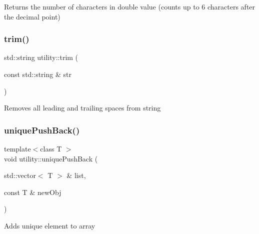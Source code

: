 Returns the number of characters in double value (counts up to 6 characters after the decimal point) \mbox{\label{namespaceutility_a4b1e0a26a1bf269307ee7e7aade748d7}} 
\subsubsection{\texorpdfstring{trim()}{trim()}}
{\footnotesize\ttfamily std\+::string utility\+::trim (\begin{DoxyParamCaption}\item[{const std\+::string \&}]{str }\end{DoxyParamCaption})}

Removes all leading and trailing spaces from string \mbox{\label{namespaceutility_a45e13892473966da52a2e701a4af9f63}} 
\subsubsection{\texorpdfstring{unique\+Push\+Back()}{uniquePushBack()}}
{\footnotesize\ttfamily template$<$class T $>$ \\
void utility\+::unique\+Push\+Back (\begin{DoxyParamCaption}\item[{std\+::vector$<$ T $>$ \&}]{list,  }\item[{const T \&}]{new\+Obj }\end{DoxyParamCaption})}

Adds unique element to array 